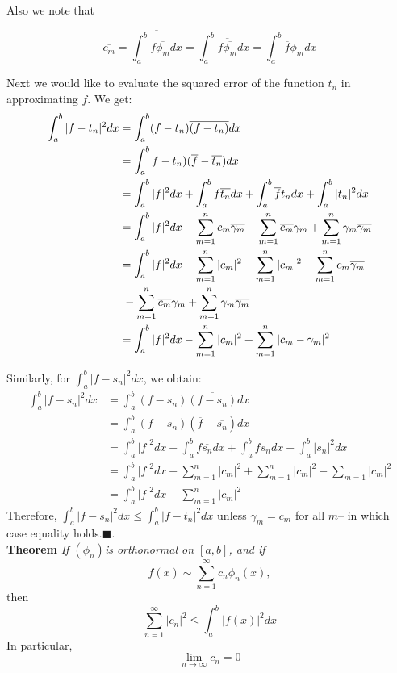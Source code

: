 \documentclass{article}
\begin{document}
Also we note that 

\begin{equation}
\overline{c_m}=\overline{\int_a^bf\overline{\phi_m}dx}  = \int_a^b\overline{f\overline{\phi_m}}dx=\int_a^b\overline{f}\phi_m dx
\end{equation}

Next we would like to evaluate the squared error of the function $t_n$ in approximating $f$.  We get:
\begin{align}
\int_a^b |f-t_n|^2 dx &= \int_a^b(f-t_n)\overline{(f-t_n )} dx\\
                     &= \int_a^bf-t_n)(\overline{f}-\overline{t_n})dx\\
                     &=\int_a^b|f|^2dx+\int_a^bf\overline{t_n}dx+\int_a^b\overline{f}t_n dx+\int_a^b|t_n|^2dx\\
                     &=\int_a^b|f|^2dx -\sum_{m=1}^nc_m\overline{\gamma_m} - \sum_{m=1}^n \overline{c_m}\gamma_m + \sum_{m=1}^n \gamma_m\overline{\gamma_m}\\
                     \nonumber
              &=\int_a^b|f|^2dx - \sum_{m=1}^n |c_m|^2+ \sum_{m=1}^n|c_m|^2-\sum_{m=1}^nc_m\overline{\gamma_m}\\& \hbox{          }- \sum_{m=1}^n \overline{c_m}\gamma_m+ \sum_{m=1}^n \gamma_m\overline{\gamma_m}\\
              \label{eq:minimize}
              &=\int_a^b|f|^2dx - \sum_{m=1}^n |c_m|^2+ \sum_{m=1}^n|c_m-\gamma_m|^2 
\end{align}

Similarly, for $\int_a^b |f-s_n|^2 dx $, we obtain:
\begin{align}
\int_a^b |f-s_n|^2 dx &= \int_a^b(f-s_n)\overline{(f-s_n )} dx\\
                     &= \int_a^b (f-s_n)(\overline{f}-\overline{s_n})dx\\
                     &=\int_a^b|f|^2dx+\int_a^bf\overline{s_n}dx+\int_a^b\overline{f}s_n dx+\int_a^b|s_n|^2dx\\
              &=\int_a^b|f|^2dx - \sum_{m=1}^n |c_m|^2+ \sum_{m=1}^n|c_m|^2 -\sum_{m=1}|c_m|^2\\
&=\int_a^b|f|^2dx - \sum_{m=1}^n |c_m|^2
\end{align}
Therefore, $\int_a^b |f-s_n|^2 dx \leq \int_a^b |f-t_n|^2 dx$ unless $\gamma_m=c_m$ for all $m$-- in which case equality holds.$\blacksquare$.\\


\textbf{Theorem} \emph{If $(\phi_n) $is orthonormal on $[a,b]$, and if }
	\begin{equation}
	f(x) \sim \sum_{n=1}^\infty c_n\phi_n(x),
\end{equation}
then
\begin{equation}
\label{eq:Bessel}
\sum_{n=1}^\infty |c_n|^2 \leq \int_a^b |f(x)|^2 dx
\end{equation}
In particular,
\begin{equation}
\lim_{n\rightarrow \infty} c_n=0
\end{equation}
\end{document}
